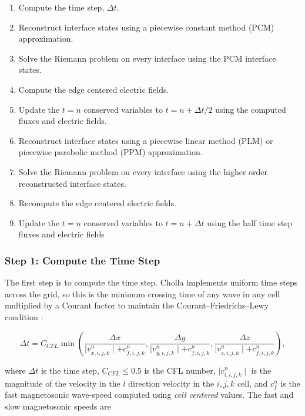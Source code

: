\documentclass[modern, linenumbers]{aastex631}
\begin{document}
\begin{enumerate}
    \item Compute the time step, $\Delta t$.
    \item Reconstruct interface states using a piecewise constant method (PCM) approximation.
    \item Solve the Riemann problem on every interface using the PCM interface states.
    \item Compute the edge centered electric fields.
    \item Update the $t=n$ conserved variables to $t=n+\Delta t/2$ using the computed fluxes and electric fields.
    \item Reconstruct interface states using a piecewise linear method (PLM) or piecewise parabolic method (PPM) approximation.
    \item Solve the Riemann problem on every interface using the higher order reconstructed interface states.
    \item Recompute the edge centered electric fields.
    \item Update the $t=n$ conserved variables to $t=n+\Delta t$ using the half time step fluxes and electric fields
\end{enumerate}


\subsubsection{Step 1: Compute the Time Step}
\label{vlct:dt}

The first step is to compute the time step. Cholla implements uniform time steps across the grid, so this is the minimum crossing time of any wave in any cell multiplied by a Courant factor to maintain the Courant–Friedrichs–Lewy condition \cite{cfl}:

\begin{equation}
        \label{eqn:dt}
        \Delta t = C_{CFL} \min \left(
            \frac{\Delta x}{\mid v^n_{x,i,j,k} \mid + c^n_{f,i,j,k}},
            \frac{\Delta y}{\mid v^n_{y,i,j,k} \mid + c^n_{f,i,j,k}},
            \frac{\Delta z}{\mid v^n_{z,i,j,k} \mid + c^n_{f,i,j,k}}
        \right),
\end{equation}

\noindent where $\Delta t$ is the time step, $C_{CFL} \leq 0.5$ is the CFL number, $\mid v^n_{l,i,j,k}\mid $ is the magnitude of the velocity in the $l$ direction velocity in the ${i,j,k}$ cell, and $c^n_f $ is the fast magnetosonic wave-speed computed using \emph{cell centered} values. The fast and slow magnetosonic speeds are
\end{document}
